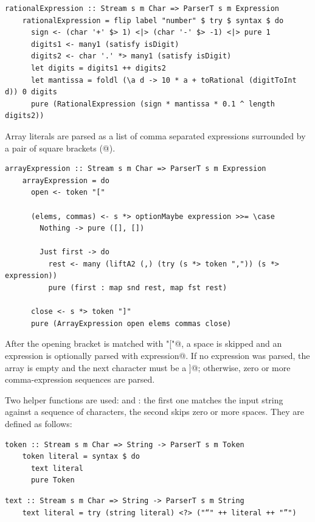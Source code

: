 \documentclass[UdineBachThesis,american,11pt,draft]{PhdThesis}
\begin{document}
  \begin{lstlisting}[gobble=4,basicstyle=\ttfamily\small]
    rationalExpression :: Stream s m Char => ParserT s m Expression
    rationalExpression = flip label "number" $ try $ syntax $ do
      sign <- (char '+' $> 1) <|> (char '-' $> -1) <|> pure 1
      digits1 <- many1 (satisfy isDigit)
      digits2 <- char '.' *> many1 (satisfy isDigit)
      let digits = digits1 ++ digits2
      let mantissa = foldl (\a d -> 10 * a + toRational (digitToInt d)) 0 digits
      pure (RationalExpression (sign * mantissa * 0.1 ^ length digits2))
  \end{lstlisting}

  Array literals are parsed as a list of comma separated expressions surrounded
  by a pair of square brackets (\lstinline@[@, \lstinline@]@).

  \begin{lstlisting}[gobble=4,basicstyle=\ttfamily\small]
    arrayExpression :: Stream s m Char => ParserT s m Expression
    arrayExpression = do
      open <- token "["

      (elems, commas) <- s *> optionMaybe expression >>= \case
        Nothing -> pure ([], [])

        Just first -> do
          rest <- many (liftA2 (,) (try (s *> token ",")) (s *> expression))
          pure (first : map snd rest, map fst rest)

      close <- s *> token "]"
      pure (ArrayExpression open elems commas close)
  \end{lstlisting}

  After the opening bracket is matched with \lstinline@token "["@, a space is
  skipped and an expression is optionally parsed with
  \lstinline@optionMaybe expression@. If no expression was parsed, the array
  is empty and the next character must be a \lstinline@]@; otherwise, zero or
  more comma-expression sequences are parsed.

  Two helper functions are used: \lstinline@token@ and \lstinline@s@: the first
  one matches the input string against a sequence of characters, the second
  skips zero or more spaces. They are defined as follows:

  \begin{lstlisting}[gobble=4,basicstyle=\ttfamily\small]
    token :: Stream s m Char => String -> ParserT s m Token
    token literal = syntax $ do
      text literal
      pure Token
  \end{lstlisting}

  \begin{lstlisting}[gobble=4,basicstyle=\ttfamily\small]
    text :: Stream s m Char => String -> ParserT s m String
    text literal = try (string literal) <?> ("“" ++ literal ++ "”")
  \end{lstlisting}
\end{document}

